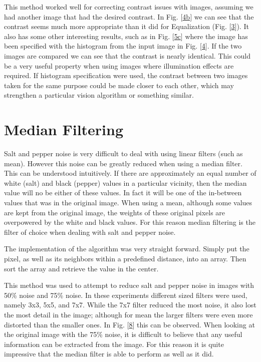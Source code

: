   This method worked well for correcting contrast issues with images, assuming we had another image
  that had the desired contrast.  In Fig. $[$\hyperref[fig:lax_spec]{4b}$]$ we can see that the
  contrast seems much more appropriate than it did for Equalization (Fig. $[$\hyperref[fig:lax_equal]{3}$]$).
  It also has some other interesting results, such as in Fig. $[$\hyperref[fig:lenna_spec]{5c}$]$ where
  the image has been specified with the histogram from the input image in Fig. $[$\hyperref[fig:lax_spec]{4}$]$.
  If the two images are compared we can see that the contrast is nearly identical.  This could be
  a very useful property when using images where illumination effects are required.  If histogram
  specification were used, the contrast between two images taken for the same purpose could be
  made closer to each other, which may strengthen a particular vision algorithm or something similar.
  \section{Median Filtering}
  
  Salt and pepper noise is very difficult to deal with using linear filters (such as mean).  However
  this noise can be greatly reduced when using a median filter.  This can be understood intuitively.
  If there are approximately an equal number of white (salt) and black (pepper) values in a particular
  vicinity, then the median value will no be either of these values.  In fact it will be one of the
  in-between values that was in the original image.  When using a mean, although some values are
  kept from the original image, the weights of these original pixels are overpowered by the white and
  black values.  For this reason median filtering is the filter of choice when dealing with salt and
  pepper noise.

  The implementation of the algorithm was very straight forward.  Simply put the pixel, as well as its
  neighbors within a predefined distance, into an array.  Then sort the array and retrieve the value
  in the center.

  This method was used to attempt to reduce salt and pepper noise in images with 50\% noise and 75\%
  noise.  In these experiments different sized filters were used, namely 3x3, 5x5, and 7x7.  While
  the 7x7 filter reduced the most noise, it also lost the most detail in the image; although for
  mean the larger filters were even more distorted than the smaller ones.  In Fig. 
  $[$\hyperref[fig:peppers_median]{8}$]$ this can be observed.  When looking at the original image
  with the 75\% noise, it is difficult to believe that any useful information can be extracted
  from the image.  For this reason it is quite impressive that the median filter is able to perform
  as well as it did.
\newpage
